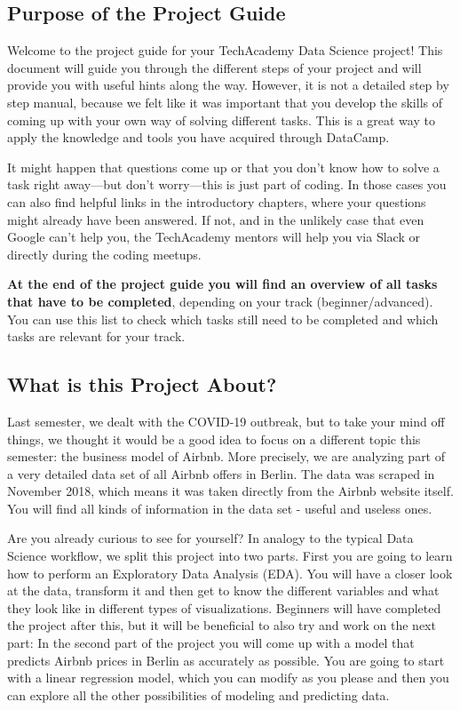 \documentclass[
  11pt,
]{article}
\begin{document}
\hypertarget{purpose-of-the-project-guide}{%
\subsection{Purpose of the Project Guide}\label{purpose-of-the-project-guide}}

Welcome to the project guide for your TechAcademy Data Science project! This document will guide you through the different steps of your project and will provide you with useful hints along the way. However, it is not a detailed step by step manual, because we felt like it was important that you develop the skills of coming up with your own way of solving different tasks. This is a great way to apply the knowledge and tools you have acquired through DataCamp.

It might happen that questions come up or that you don't know how to solve a task right away---but don't worry---this is just part of coding. In those cases you can also find helpful links in the introductory chapters, where your questions might already have been answered. If not, and in the unlikely case that even Google can't help you, the TechAcademy mentors will help you via Slack or directly during the coding meetups.

\textbf{At the end of the project guide you will find an overview of all tasks that have to be completed}, depending on your track (beginner/advanced). You can use this list to check which tasks still need to be completed and which tasks are relevant for your track.

\hypertarget{what-is-this-project-about}{%
\subsection{What is this Project About?}\label{what-is-this-project-about}}

Last semester, we dealt with the COVID-19 outbreak, but to take your mind off things, we thought it would be a good idea to focus on a different topic this semester: the business model of Airbnb. More precisely, we are analyzing part of a very detailed data set of all Airbnb offers in Berlin. The data was scraped in November 2018, which means it was taken directly from the Airbnb website itself. You will find all kinds of information in the data set - useful and useless ones.

Are you already curious to see for yourself? In analogy to the typical Data Science workflow, we split this project into two parts. First you are going to learn how to perform an Exploratory Data Analysis (EDA). You will have a closer look at the data, transform it and then get to know the different variables and what they look like in different types of visualizations. Beginners will have completed the project after this, but it will be beneficial to also try and work on the next part: In the second part of the project you will come up with a model that predicts Airbnb prices in Berlin as accurately as possible. You are going to start with a linear regression model, which you can modify as you please and then you can explore all the other possibilities of modeling and predicting data.
\end{document}
